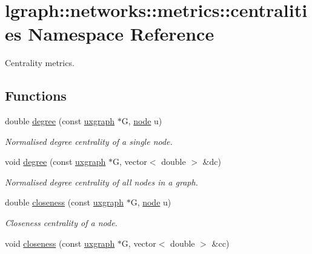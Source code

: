 \hypertarget{namespacelgraph_1_1networks_1_1metrics_1_1centralities}{}\section{lgraph\+:\+:networks\+:\+:metrics\+:\+:centralities Namespace Reference}
\label{namespacelgraph_1_1networks_1_1metrics_1_1centralities}


Centrality metrics.  


\subsection*{Functions}
\begin{DoxyCompactItemize}
\item 
double \hyperlink{namespacelgraph_1_1networks_1_1metrics_1_1centralities_a059db418660d28d673a154ceef293469}{degree} (const \hyperlink{classlgraph_1_1utils_1_1uxgraph}{uxgraph} $\ast$G, \hyperlink{namespacelgraph_1_1utils_a7bd66ede3805ef121bc2835bd48de0cf}{node} u)
\begin{DoxyCompactList}\small\item\em Normalised degree centrality of a single node. \end{DoxyCompactList}\item 
void \hyperlink{namespacelgraph_1_1networks_1_1metrics_1_1centralities_abd975d6e07c32b07b48b1501dc8215a1}{degree} (const \hyperlink{classlgraph_1_1utils_1_1uxgraph}{uxgraph} $\ast$G, vector$<$ double $>$ \&dc)
\begin{DoxyCompactList}\small\item\em Normalised degree centrality of all nodes in a graph. \end{DoxyCompactList}\item 
double \hyperlink{namespacelgraph_1_1networks_1_1metrics_1_1centralities_a5e567539ccb6396bfb47ba2173a0cc4c}{closeness} (const \hyperlink{classlgraph_1_1utils_1_1uxgraph}{uxgraph} $\ast$G, \hyperlink{namespacelgraph_1_1utils_a7bd66ede3805ef121bc2835bd48de0cf}{node} u)
\begin{DoxyCompactList}\small\item\em Closeness centrality of a node. \end{DoxyCompactList}\item 
void \hyperlink{namespacelgraph_1_1networks_1_1metrics_1_1centralities_aec116343b65bf300d2d820021e020374}{closeness} (const \hyperlink{classlgraph_1_1utils_1_1uxgraph}{uxgraph} $\ast$G, vector$<$ double $>$ \&cc)

\end{DoxyCompactItemize}

